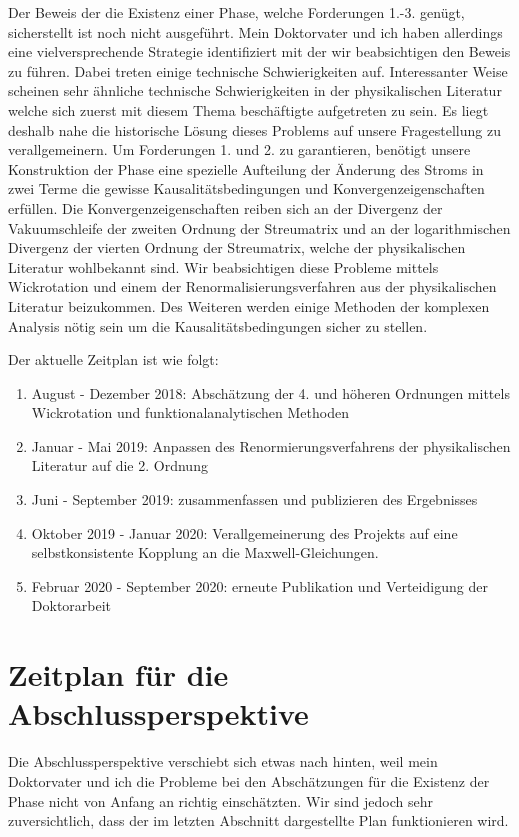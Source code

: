 \documentclass[a4paper,12pt]{article}
\begin{document}
Der Beweis der die Existenz einer Phase, welche Forderungen 1.-3. genügt, sicherstellt ist noch nicht 
ausgeführt. Mein Doktorvater und ich haben allerdings eine vielversprechende Strategie identifiziert mit der wir beabsichtigen
den Beweis zu führen. Dabei treten einige technische Schwierigkeiten auf. Interessanter Weise scheinen sehr ähnliche 
technische Schwierigkeiten in der physikalischen Literatur welche
sich zuerst mit diesem Thema beschäftigte aufgetreten zu sein. Es liegt deshalb nahe die historische Lösung dieses 
Problems auf unsere Fragestellung zu verallgemeinern. Um Forderungen 1. und 2. zu garantieren,
benötigt unsere Konstruktion der Phase eine
spezielle Aufteilung der Änderung des Stroms in zwei Terme die gewisse Kausalitätsbedingungen und 
Konvergenzeigenschaften erfüllen. Die Konvergenzeigenschaften reiben sich an der Divergenz der 
Vakuumschleife der zweiten Ordnung der Streumatrix und an der logarithmischen Divergenz der vierten Ordnung
der Streumatrix, welche der physikalischen Literatur wohlbekannt sind. Wir beabsichtigen diese Probleme 
mittels Wickrotation und einem der Renormalisierungsverfahren aus der physikalischen Literatur beizukommen. 
Des Weiteren werden einige Methoden der komplexen Analysis nötig sein um die Kausalitätsbedingungen sicher zu stellen.

Der aktuelle Zeitplan ist wie folgt:

\begin{enumerate}
\item August - Dezember 2018: Abschätzung der 4. und höheren Ordnungen mittels Wickrotation und funktionalanalytischen Methoden
\item Januar - Mai 2019: Anpassen des Renormierungsverfahrens der physikalischen Literatur auf die 2. Ordnung
\item Juni - September 2019: zusammenfassen und publizieren des Ergebnisses
\item Oktober 2019 - Januar 2020:  Verallgemeinerung des Projekts auf eine selbstkonsistente Kopplung an die Maxwell-Gleichungen.
\item Februar 2020 - September 2020: erneute Publikation und Verteidigung der Doktorarbeit
\end{enumerate}

\section{Zeitplan für die Abschlussperspektive}

Die Abschlussperspektive verschiebt sich etwas nach hinten, weil mein Doktorvater und ich die Probleme bei den
Abschätzungen für die Existenz der Phase nicht von Anfang an richtig einschätzten. Wir sind jedoch sehr zuversichtlich,
dass der im letzten Abschnitt dargestellte Plan funktionieren wird. 
\end{document}
